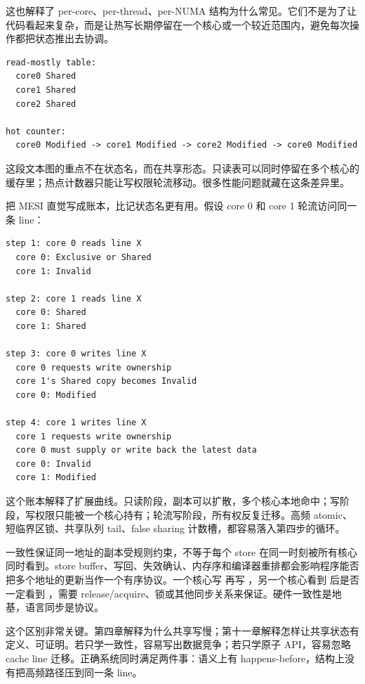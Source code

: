 这也解释了 per-core、per-thread、per-NUMA 结构为什么常见。它们不是为了让代码看起来复杂，而是让热写长期停留在一个核心或一个较近范围内，避免每次操作都把状态推出去协调。

\begin{lstlisting}[numbers=none,caption={MESI 直觉下的两类共享}]
read-mostly table:
  core0 Shared
  core1 Shared
  core2 Shared

hot counter:
  core0 Modified -> core1 Modified -> core2 Modified -> core0 Modified
\end{lstlisting}

这段文本图的重点不在状态名，而在共享形态。只读表可以同时停留在多个核心的缓存里；热点计数器只能让写权限轮流移动。很多性能问题就藏在这条差异里。

把 MESI 直觉写成账本，比记状态名更有用。假设 core 0 和 core 1 轮流访问同一条 line：

\begin{lstlisting}[numbers=none,caption={同一条 line 的状态迁移账本}]
step 1: core 0 reads line X
  core 0: Exclusive or Shared
  core 1: Invalid

step 2: core 1 reads line X
  core 0: Shared
  core 1: Shared

step 3: core 0 writes line X
  core 0 requests write ownership
  core 1's Shared copy becomes Invalid
  core 0: Modified

step 4: core 1 writes line X
  core 1 requests write ownership
  core 0 must supply or write back the latest data
  core 0: Invalid
  core 1: Modified
\end{lstlisting}

这个账本解释了扩展曲线。只读阶段，副本可以扩散，多个核心本地命中；写阶段，写权限只能被一个核心持有；轮流写阶段，所有权反复迁移。高频 atomic、短临界区锁、共享队列 tail、false sharing 计数槽，都容易落入第四步的循环。

一致性保证同一地址的副本受规则约束，不等于每个 store 在同一时刻被所有核心同时看到。store buffer、写回、失效确认、内存序和编译器重排都会影响程序能否把多个地址的更新当作一个有序协议。一个核心写  再写 ，另一个核心看到  后是否一定看到 ，需要 release/acquire、锁或其他同步关系来保证。硬件一致性是地基，语言同步是协议。

这个区别非常关键。第四章解释为什么共享写慢；第十一章解释怎样让共享状态有定义、可证明。若只学一致性，容易写出数据竞争；若只学原子 API，容易忽略 cache line 迁移。正确系统同时满足两件事：语义上有 happens-before，结构上没有把高频路径压到同一条 line。

